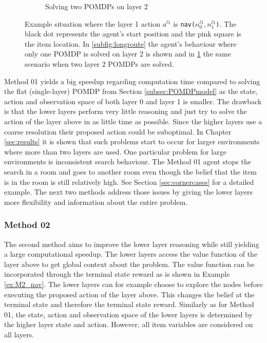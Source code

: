 \begin{figure}
\begin{subfigure}[b]{0.45\textwidth}
        \caption{Solving two POMDPs on layer 2}
        \label{subfig:shortroute}
    \end{subfigure}
    \caption{Example situation where the layer 1 action $a^{l1}$ is \texttt{nav($n_0^{l1},n_1^{l1}$)}. The black dot represents the agent's start position and the pink square is the item location. In \ref{subfig:longroute} the agent's behaviour where only one POMDP is solved on layer 2 is shown and in \ref{subfig:shortroute} the same scenario when two layer 2 POMDPs are solved.}
    \label{fig:two_terminal_states}
\end{figure}

Method 01 yields a big speedup regarding computation time compared to solving the flat (single-layer) POMDP from Section \ref{subsec:POMDPmodel} as the state, action and observation space of both layer 0 and layer 1 is smaller. The drawback is that the lower layers perform very little reasoning and just try to solve the action of the layer above in as little time as possible. Since the higher layers use a coarse resolution their proposed action could be suboptimal. In Chapter \ref{sec:results} it is shown that such problems start to occur for larger environments where more than two layers are used. One particular problem for large environments is inconsistent search behaviour. The Method 01 agent stops the search in a room and goes to another room even though the belief that the item is in the room is still relatively high. See Section \ref{sec:cornercases} for a detailed example. 
The next two methods address those issues by giving the lower layers more flexibility and information about the entire problem.

\subsubsection{Method 02}\label{subsec:M2}
The second method aims to improve the lower layer reasoning while still yielding a large computational speedup. The lower layers access the value function of the layer above to get global context about the problem. The value function can be incorporated through the terminal state reward as is shown in Example \ref{ex:M2_nav}. The lower layers can for example choose to explore the nodes before executing the proposed action of the layer above. This changes the belief at the terminal state and therefore the terminal state reward. Similarly as for Method 01, the state, action and observation space of the lower layers is determined by the higher layer state and action. However, all item variables are considered on all layers.

